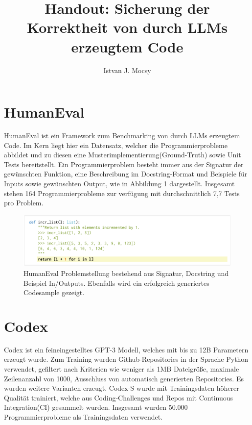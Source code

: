 \documentclass[fleqn,10pt]{wlscirep}
\title{Handout: Sicherung der Korrektheit von durch LLMs erzeugtem Code}
\author{Istvan J. Mocsy}
\begin{document}
\flushbottom
\maketitle

\thispagestyle{empty}
\section*{HumanEval}
HumanEval ist ein Framework zum Benchmarking von durch LLMs erzeugtem Code. Im Kern liegt hier ein Datensatz, welcher die Programmierprobleme abbildet und zu diesen eine Musterimplementierung(Ground-Truth) sowie Unit Tests bereitstellt. Ein Programmierproblem besteht immer aus der Signatur der gewünschten Funktion, eine Beschreibung im Docstring-Format und Beispiele für Inputs sowie gewünschten Output, wie in Abbildung 1 dargestellt. Insgesamt stehen 164 Programmierprobleme zur verfügung mit durchschnittlich 7,7 Tests pro Problem.\cite{chen2021evaluating}
    \begin{figure}
        \centering
        \includegraphics[width=0.8\paperwidth]{image/humanevalproblem.png}
        \caption{HumanEval Problemstellung bestehend aus Signatur, Docstring und Beispiel In/Outputs.           Ebenfalls wird ein erfolgreich generiertes Codesample gezeigt.\cite{chen2021evaluating}}
    \end{figure}
\section*{Codex}
Codex ist ein feineingestelltes GPT-3 Modell, welches mit bis zu 12B Parametern erzeugt wurde. Zum Training wurden Github-Repositories in der Sprache Python verwendet, gefiltert nach Kriterien wie weniger als 1MB Dateigröße, maximale Zeilenanzahl von 1000, Ausschluss von automatisch generierten Repositories. Es wurden weitere Varianten erzeugt. Codex-S wurde mit Trainingsdaten höherer Qualität trainiert, welche aus Coding-Challenges und Repos mit Continuous Integration(CI) gesammelt wurden. Insgesamt wurden 50.000 Programmierprobleme als Trainingsdaten verwendet.\cite{chen2021evaluating}
\end{document}
